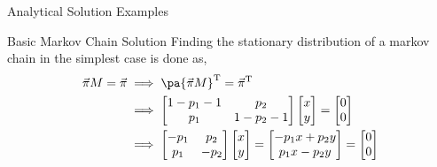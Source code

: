 \documentclass[aspectratio=169]{RUCPresentation}
\begin{document}
\begin{frame}{Analytical Solution Examples}
\end{frame}



\begin{frame}{Basic Markov Chain Solution}
    Finding the stationary distribution of a markov chain in the simplest case is done as,
\begin{align*}
    \vec{\pi} M = \vec{\pi} 
    &\implies \pa{\vec{\pi}M}^{\mathrm{T}} = \vec{\pi}^{\mathrm{T}} \\
    &\implies \left[
        \begin{matrix}
            1-p_1 - 1 & p_2 \\
            p_1 & 1-p_2 -1
        \end{matrix}
    \right]
    \left[
        \begin{matrix}
            x \\ y
        \end{matrix}
    \right]
    =
    \left[
        \begin{matrix}
            0 \\ 0
        \end{matrix}
    \right]\\
    &\implies \left[
        \begin{matrix}
            -p_1 & p_2 \\
            p_1 & -p_2
        \end{matrix}
    \right]
    \left[
        \begin{matrix}
            x \\ y
        \end{matrix}
    \right]
    =
    \left[
        \begin{matrix}
            -p_1 x + p_2 y \\
             p_1 x - p_2 y
        \end{matrix}
    \right]
    =
    \left[
        \begin{matrix}
            0 \\ 0
        \end{matrix}
    \right]
\end{align*}


\end{frame}
\end{document}
